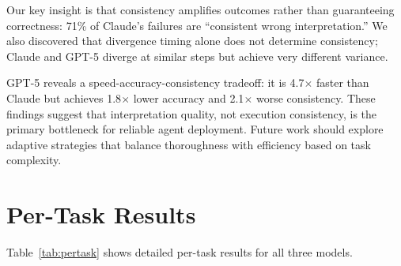 \documentclass{article}
\begin{document}
Our key insight is that consistency amplifies outcomes rather than guaranteeing correctness: 71\% of Claude's failures are ``consistent wrong interpretation.'' We also discovered that divergence timing alone does not determine consistency; Claude and GPT-5 diverge at similar steps but achieve very different variance.

GPT-5 reveals a speed-accuracy-consistency tradeoff: it is 4.7$\times$ faster than Claude but achieves 1.8$\times$ lower accuracy and 2.1$\times$ worse consistency. These findings suggest that interpretation quality, not execution consistency, is the primary bottleneck for reliable agent deployment. Future work should explore adaptive strategies that balance thoroughness with efficiency based on task complexity.






\appendix

\section{Per-Task Results}
\label{app:pertask}

Table~\ref{tab:pertask} shows detailed per-task results for all three models.
\end{document}
